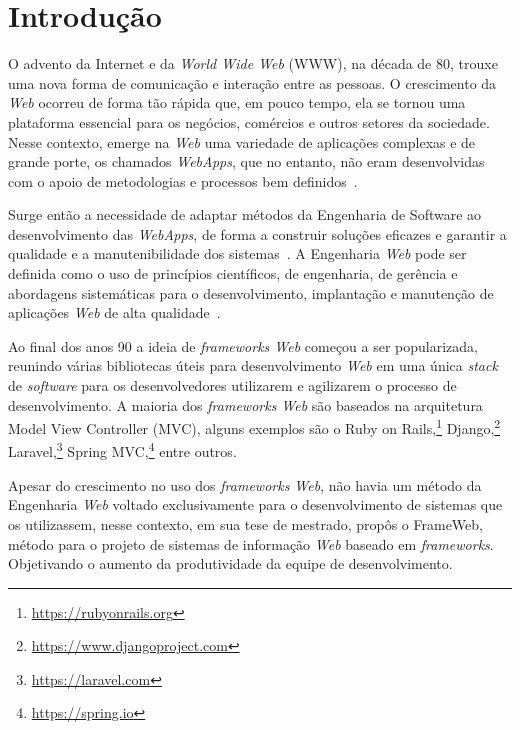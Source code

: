 \chapter{Introdução}
\label{sec-intro}

O advento da Internet e da \textit{World Wide Web} (WWW), na década de 80, trouxe uma nova
forma de comunicação e interação entre as pessoas. O crescimento da \textit{Web} ocorreu de forma tão
rápida que, em pouco tempo, ela se tornou uma plataforma essencial para os negócios, comércios
e outros setores da sociedade. Nesse contexto, emerge na \textit{Web} uma variedade de aplicações
complexas e de grande porte, os chamados \textit{WebApps}, que no entanto, não eram desenvolvidas com o apoio de
metodologias e processos bem definidos~\cite{murugesan:2001}.


Surge então a necessidade de adaptar métodos da Engenharia de Software ao desenvolvimento
das \textit{WebApps}, de forma a construir soluções eficazes e garantir a qualidade e a manutenibilidade 
dos sistemas~\cite{beder:2017}. A Engenharia \textit{Web} pode ser definida como o uso de 
princípios científicos, de engenharia, de gerência e abordagens sistemáticas para o desenvolvimento,
implantação e manutenção de aplicações \textit{Web} de alta qualidade~\cite{murugesan:2001}.

Ao final dos anos 90 a ideia de \textit{frameworks Web} começou a ser popularizada, reunindo 
várias bibliotecas úteis para desenvolvimento \textit{Web} em uma única \textit{stack} de \textit{software}
para os desenvolvedores utilizarem e agilizarem o processo de desenvolvimento. A maioria dos
\textit{frameworks Web} são baseados na arquitetura Model View Controller (MVC), alguns exemplos
são o Ruby on Rails,\footnote{\url{https://rubyonrails.org}} Django,\footnote{\url{https://www.djangoproject.com}} 
Laravel,\footnote{\url{https://laravel.com}} Spring MVC,\footnote{\url{https://spring.io}} entre outros.

Apesar do crescimento no uso dos \textit{frameworks Web}, não havia um método da Engenharia \textit{Web} 
voltado exclusivamente para o desenvolvimento de sistemas que os utilizassem, nesse contexto, em sua 
tese de mestrado,  propôs o FrameWeb, método para o projeto de sistemas de 
informação \textit{Web} baseado em \textit{frameworks}. Objetivando o aumento da produtividade da 
equipe de desenvolvimento.

